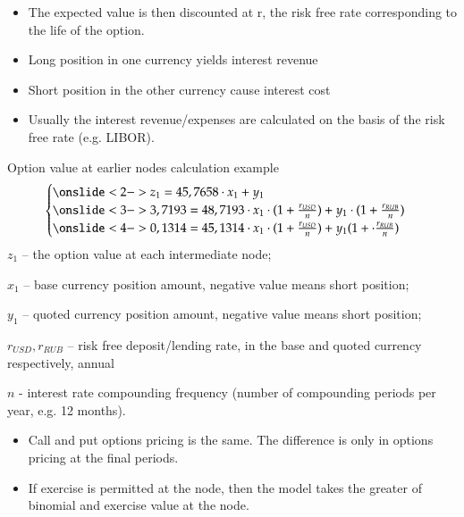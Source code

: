 \documentclass[_international_finance_p1.tex]{subfiles}
\begin{document}
\begin{frame}{}
\begin{itemize}[<+->]
\item
The expected value is then discounted at r, the risk free rate corresponding to the life of the option. 
\item
Long position in one currency yields interest revenue
\item
Short position in the other currency cause interest cost
\item
Usually the interest revenue/expenses are calculated on the basis of the risk free rate (e.g. LIBOR).
\end{itemize}
\end{frame}
\begin{frame}[shrink=10]{Option value at earlier nodes calculation example}
\begin{align*}
\begin{cases} 
\onslide<2->{z_1 = 45,7658 \cdot x_1 + y_1}\\ 
\onslide<3->{3,7193 = 48,7193 \cdot x_1 \cdot (1 + \frac{r_{USD}}{n}) + y_1 \cdot (1 + \frac{r_{RUB}}{n})}\\
\onslide<4->{0,1314 = 45,1314 \cdot x_1 \cdot (1 + \frac{r_{USD}}{n}) + y_1 (1 + \cdot \frac{r_{RUB}}{n})}
\end{cases}
\end{align*}
$z_1$ – the option value at each intermediate node;

$x_1$ – base currency position amount, negative value means short position;

$y_1$ – quoted currency position amount, negative value means short position;

$r_{USD},r_{RUB}$ – risk free deposit/lending rate, in the base and quoted currency respectively, annual

$n$ - interest rate compounding frequency (number of compounding periods per year, e.g. 12 months).
\end{frame}
\begin{frame}{}
\begin{itemize}[<+->]
\item
Call and put options pricing is the same. The difference is only in options pricing at the final periods.
\item
If exercise is permitted at the node, then the model takes the greater of binomial and exercise value at the node.
\end{itemize}
\end{frame}
\end{document}
